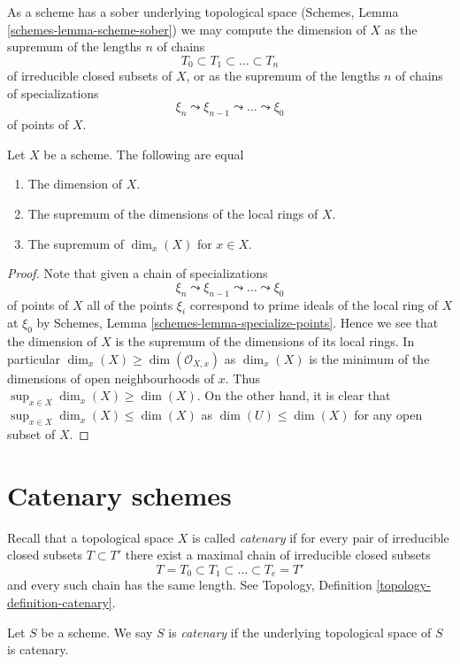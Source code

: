 \noindent
As a scheme has a sober underlying topological space
(Schemes, Lemma \ref{schemes-lemma-scheme-sober})
we may compute the dimension of $X$ as the supremum of the lengths $n$
of chains
$$
T_0 \subset T_1 \subset \ldots \subset T_n
$$
of irreducible closed subsets of $X$, or as the supremum of the lengths $n$
of chains of specializations
$$
\xi_n \leadsto \xi_{n - 1} \leadsto \ldots \leadsto \xi_0
$$
of points of $X$.

\begin{lemma}
\label{lemma-dimension}
Let $X$ be a scheme. The following are equal
\begin{enumerate}
\item The dimension of $X$.
\item The supremum of the dimensions of the local rings of $X$.
\item The supremum of $\dim_x(X)$ for $x \in X$.
\end{enumerate}
\end{lemma}

\begin{proof}
Note that given a chain of specializations
$$
\xi_n \leadsto \xi_{n - 1} \leadsto \ldots \leadsto \xi_0
$$
of points of $X$ all of the points $\xi_i$ correspond to prime ideals
of the local ring of $X$ at $\xi_0$ by
Schemes, Lemma \ref{schemes-lemma-specialize-points}.
Hence we see that the dimension of $X$ is the supremum of the dimensions
of its local rings. In particular $\dim_x(X) \geq \dim(\mathcal{O}_{X, x})$
as $\dim_x(X)$ is the minimum of the dimensions of open neighbourhoods of
$x$. Thus $\sup_{x \in X} \dim_x(X) \geq \dim(X)$. On the other hand,
it is clear that $\sup_{x \in X} \dim_x(X) \leq \dim(X)$
as $\dim(U) \leq \dim(X)$ for any open subset of $X$.
\end{proof}




\section{Catenary schemes}
\label{section-catenary}

\noindent
Recall that a topological space $X$ is called {\it catenary} if
for every pair of irreducible closed subsets $T \subset T'$
there exist a maximal chain of irreducible closed subsets
$$
T = T_0 \subset T_1 \subset \ldots \subset T_e = T'
$$
and every such chain has the same length. See
Topology, Definition \ref{topology-definition-catenary}.

\begin{definition}
\label{definition-catenary}
Let $S$ be a scheme. We say $S$ is {\it catenary} if the
underlying topological space of $S$ is catenary.
\end{definition}

